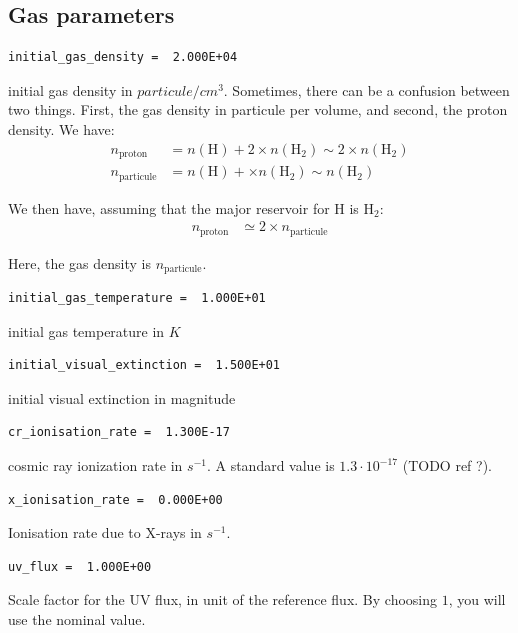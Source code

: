 \documentclass[english,a4paper,twoside]{article}
\begin{document}
\subsection{Gas parameters}


\begin{verbatim}
initial_gas_density =  2.000E+04
\end{verbatim}
initial gas density in $\unit{particule/cm^{3}}$. Sometimes, there can be a confusion between two things. First, the gas density in particule per volume, and second, the proton density. We have:
\begin{align*}
n_\text{proton} &= n(\mathrm{H}) + 2\times n(\mathrm{H_2}) \sim 2\times n(\mathrm{H_2})\\
n_\text{particule} &= n(\mathrm{H}) + \times n(\mathrm{H_2}) \sim n(\mathrm{H_2})
\end{align*}

We then have, assuming that the major reservoir for H is $\mathrm{H_2}$:
\begin{align}
n_\text{proton} &\simeq 2\times n_\text{particule}
\end{align}

Here, the gas density is $n_\text{particule}$.

\begin{verbatim}
initial_gas_temperature =  1.000E+01
\end{verbatim}
initial gas temperature  in $\unit{K}$

\begin{verbatim}
initial_visual_extinction =  1.500E+01
\end{verbatim}
initial visual extinction in magnitude

\begin{verbatim}
cr_ionisation_rate =  1.300E-17
\end{verbatim}
cosmic ray ionization rate in $\unit{s^{-1}}$. A standard value is $1.3\cdot 10^{-17}$ (TODO ref ?).

\begin{verbatim}
x_ionisation_rate =  0.000E+00
\end{verbatim}
Ionisation rate due to X-rays in $\unit{s^{-1}}$.

\begin{verbatim}
uv_flux =  1.000E+00
\end{verbatim}
Scale factor for the UV flux, in unit of the reference flux. By choosing $1$, you will use the nominal value.
\end{document}
